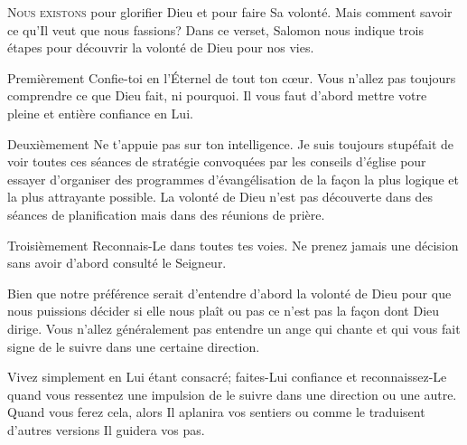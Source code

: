 
\lettrine{N}{ous existons} pour glorifier Dieu et pour faire Sa volonté.
 Mais comment savoir ce qu'Il veut que nous fassions?
 Dans ce verset, Salomon nous indique trois étapes pour découvrir
 la volonté de Dieu pour nos vies. 

Premièrement\frcolon{} \Og Confie-toi en l'Éternel de tout ton c\oe{}ur. \Fg{}
 Vous n'allez pas toujours comprendre ce que Dieu fait, ni pourquoi.
 Il vous faut d'abord mettre votre pleine et entière confiance en Lui. 

Deuxièmement\frcolon{} \Og Ne t'appuie pas sur ton intelligence. \Fg{}
 Je suis toujours stupéfait de voir toutes ces séances de stratégie
 convoquées par les conseils d'église pour essayer d'organiser
 des programmes d'évangélisation de la fa\c{c}on la plus logique
 et la plus attrayante possible.
 La volonté de Dieu n'est pas découverte dans des séances
 de planification mais dans des réunions de prière. 

Troisièmement\frcolon{} \Og Reconnais-Le dans toutes tes voies. \Fg{}
 Ne prenez jamais une décision sans avoir d'abord consulté le Seigneur. 


Bien que notre préférence serait d'entendre d'abord la volonté de Dieu
 \ocadr pour que nous puissions décider si elle nous plaît ou pas \Fg{}
 ce n'est pas la fa\c{c}on dont Dieu dirige.
 Vous n'allez généralement pas entendre un ange qui chante
 et qui vous fait signe de le suivre dans une certaine direction. 

Vivez simplement en Lui étant consacré; faites-Lui confiance
 et reconnaissez-Le quand vous ressentez une impulsion de le suivre
 dans une direction ou une autre.
 Quand vous ferez cela, alors \Og Il aplanira vos sentiers \Fg{}
 ou comme le traduisent d'autres versions \Og Il guidera vos pas. \Fg{}

\dvrule





